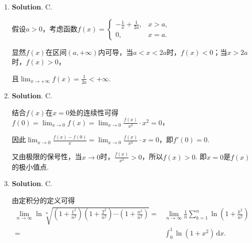 \documentclass[../main.tex]{subfiles}
\begin{document}
\begin{enumerate}
          对于C选项，考虑$x_{n}=(-1)^{n}$，$y_{n}=(-1)^{n}+\frac{1}{n}$，则$\lim_{n\to\infty}(x_{n}-y_{n})=\lim_{n\to\infty}\left(-\frac{1}{n}\right)=0$，但$\{x_{n}\}$与$\{y_{n}\}$均发散.

    \item \textbf{Solution}. C.

          假设$a>0$，考虑函数$f(x)=
              \begin{cases}
                  -\frac{1}{x}+\frac{1}{2a}, & x>a, \\
                  0,                         & x=a.
              \end{cases}$

          显然$f(x)$在区间$(a,+\infty)$内可导，当$a<x<2a$时，$f(x)<0$；当$x>2a$时，$f
              (x)>0$，

          且$\lim_{x\to+\infty}f(x)=\frac{1}{2a}<+\infty$.

    \item \textbf{Solution}. C.

          结合$f(x)$在$x=0$处的连续性可得$f(0)=\lim_{x\to0}f(x)=\lim_{x\to0}\frac{f(x)}{x^{2}}
              \cdot x^{2}=0$，

          因此$\lim_{x\to0}\frac{f(x)-f(0)}{x}=\lim_{x\to0}\frac{f(x)}{x^{2}}\cdot x=
              0$，即$f'(0)=0$.

          又由极限的保号性，当$x\to0$时，$\frac{f(x)}{x^{2}}>0$，所以$f(x)>0$. 即$x=0$是$f
              (x)$的极小值点.

    \item \textbf{Solution}. C.

          由定积分的定义可得
          \[
              \begin{aligned}
                  \lim_{n\to\infty}\ln\sqrt[n]{\left(1+\frac{1^2}{n^2}\right)\left(1+\frac{2^2}{n^2}\right)\cdots\left(1+\frac{n^2}{n^2}\right)}= {} & \lim_{n\to\infty}\frac{1}{n}\sum_{k=1}^{n}\ln\left(1+\frac{k^2}{n^2}\right) \\
                  = {}                                                                                                                               & \int_{0}^{1}\ln(1+x^{2})\,\mathrm{d}x.
              \end{aligned}
          \]
\end{enumerate}
\end{document}
